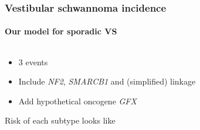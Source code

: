 \documentclass{beamer}
\begin{document}

\begin{frame}
    \frametitle{Vestibular schwannoma incidence}
    \framesubtitle{Our model for sporadic VS}

    \begin{columns}
        \begin{column}{0.5\textwidth}
        \begin{itemize}
            \item 3 events\footnotemark[2]
            \item Include \emph{NF2}, \emph{SMARCB1} and (simplified) linkage
            \item Add hypothetical oncogene \emph{GFX}
        \end{itemize}

        \;

        Risk of each subtype looks like


\end{column}
\end{columns}
\end{frame}
\end{document}
